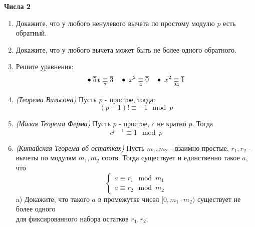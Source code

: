 \centerline{\bf \large Числа 2}
\begin{enumerate}
называется подмножество целых чисел, дающих одинаковые остатки по какому-либо фиксированному
модулю. С ними можно делать те же операции, что и с целыми числами - складывать, умножать, возводить
в степень. То, что это не число, а вычет, которому принадлежит это число, показывает черта над
числом.  При операциях с ними обычно используются т.н. {\it представители} - просто числа, имеющие
нужный остаток. Например:
\[ \overline{5} + \overline{7} \equiv \overline{12} \equiv \overline{2} \equiv \overline{-8} \mod
10\]

С ними связано множество теорем, используемых в современной криптографии и параллельных вычислениях.

-- Это законно вообще?

-- Да, в предыдущем листке в задачах доказывается корректность сложения и умножения.

 Вычет чисел, которые делятся на значение модуля.

 $a^{-1}$ для $a$ называется такой вычет $b$, что $a \cdot b \equiv 1
\mod n$. Вычет, у которого есть обратный, называется обратимым.
\item Докажите, что у любого ненулевого вычета по простому модулю $p$ есть обратный.
\item Докажите, что у любого вычета может быть не более одного обратного.
\item Решите уравнения:
\[\bullet \; \overline{5}x \underset{7}{\equiv} \overline{3} \quad \bullet \; x^2 \underset{4}{\equiv} \overline{0} \quad \bullet \;
x^2 \underset{24}{\equiv} \overline{1} \]
\item {\it (Теорема Вильсона)} Пусть $p$ - простое, тогда:
\[(p - 1)! \equiv -1 \mod p\]
\item {\it (Малая Теорема Ферма)} Пусть $p$ - простое, $c $ не кратно $p$. Тогда
\[c^{p - 1} \equiv 1 \mod p\]
\item {\it (Китайская Теорема об остатках)} Пусть $m_1, m_2$ - взаимно простые, $r_1, r_2$ - вычеты
по модулям $m_1, m_2$ соотв. Тогда существует и единственно такое $a$, что
\[
\begin{cases}
    a \equiv r_1 \mod m_1\\
    a \equiv r_2 \mod m_2
\end{cases}
\]
a) Докажите, что такого $a$ в промежутке чисел $[0, m_1 \cdot m_2)$ существует не более одного \\
для фиксированного набора остатков $r_1, r_2$;


\end{enumerate}
